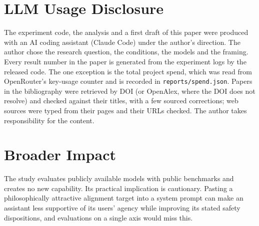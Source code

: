 \section*{LLM Usage Disclosure}
The experiment code, the analysis and a first draft of this paper were produced with an AI coding assistant
(Claude Code) under the author's direction. The author chose the research question, the conditions, the models and
the framing. Every result number in the paper is generated from the experiment logs by the released code. The one
exception is the total project spend, which was read from OpenRouter's key-usage counter and is recorded in
\texttt{reports/spend.json}. Papers in the bibliography were retrieved by DOI (or OpenAlex, where the DOI does not
resolve) and checked against their titles, with a few sourced corrections; web sources were typed from their pages and
their URLs checked. The author takes responsibility for the content.

\section*{Broader Impact}
The study evaluates publicly available models with public benchmarks and creates no new capability. Its practical
implication is cautionary. Pasting a philosophically attractive alignment target into a system prompt can make an
assistant less supportive of its users' agency while improving its stated safety dispositions, and evaluations on a
single axis would miss this.
